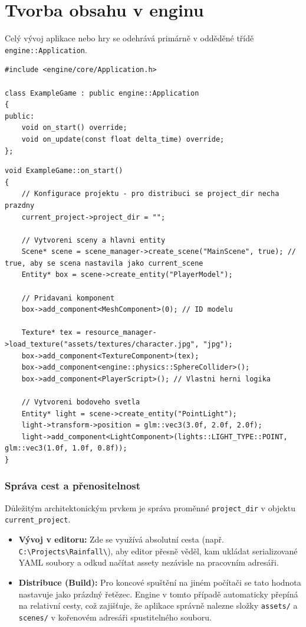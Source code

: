 \documentclass[12pt,a4paper]{article}
\begin{document}
\section{Tvorba obsahu v enginu}
Celý vývoj aplikace nebo hry se odehrává primárně v odděděné třídě \texttt{engine::Application}.

\begin{lstlisting}[caption={Vytvoření ukázkové aplikace}]
#include <engine/core/Application.h>

class ExampleGame : public engine::Application
{
public:
    void on_start() override;
    void on_update(const float delta_time) override;
};
\end{lstlisting}

\begin{lstlisting}[caption={Ukázka definice scény a entit v C++}]
void ExampleGame::on_start()
{
    // Konfigurace projektu - pro distribuci se project_dir necha prazdny
    current_project->project_dir = "";

    // Vytvoreni sceny a hlavni entity
    Scene* scene = scene_manager->create_scene("MainScene", true); // true, aby se scena nastavila jako current_scene
    Entity* box = scene->create_entity("PlayerModel");

    // Pridavani komponent 
    box->add_component<MeshComponent>(0); // ID modelu

    Texture* tex = resource_manager->load_texture("assets/textures/character.jpg", "jpg");
    box->add_component<TextureComponent>(tex);
    box->add_component<engine::physics::SphereCollider>();
    box->add_component<PlayerScript>(); // Vlastni herni logika

    // Vytvoreni bodoveho svetla
    Entity* light = scene->create_entity("PointLight");
    light->transform->position = glm::vec3(3.0f, 2.0f, 2.0f);
    light->add_component<LightComponent>(lights::LIGHT_TYPE::POINT, glm::vec3(1.0f, 1.0f, 0.8f));
}
\end{lstlisting}

\subsubsection{Správa cest a přenositelnost}
Důležitým architektonickým prvkem je správa proměnné \texttt{project\_dir} v objektu \texttt{current\_project}.
\begin{itemize}
\item \textbf{Vývoj v editoru:} Zde se využívá absolutní cesta (např. \texttt{C:\textbackslash{}Projects\textbackslash{}Rainfall\textbackslash{}}), aby editor přesně věděl, kam ukládat serializované YAML soubory a odkud načítat assety nezávisle na pracovním adresáři.
\item \textbf{Distribuce (Build):} Pro koncové spuštění na jiném počítači se tato hodnota nastavuje jako prázdný řetězec. Engine v tomto případě automaticky přepíná na relativní cesty, což zajišťuje, že aplikace správně nalezne složky \texttt{assets/} a \texttt{scenes/} v kořenovém adresáři spustitelného souboru.
\end{itemize}
\end{document}
